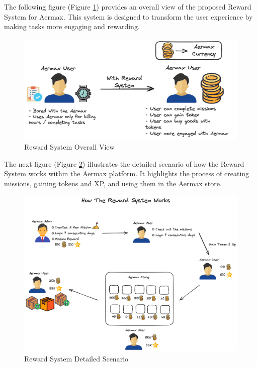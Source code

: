 The following figure (Figure \ref{fig:Reward_System_explain_image}) provides an overall view of the proposed Reward System for Aermax. This system is designed to transform the user experience by making tasks more engaging and rewarding.

\begin{figure}[H]
    \centering
    \includegraphics[width=1\textwidth]{src/assets/diagrams/rewardexplain.png}
    \caption{Reward System Overall View}
    \label{fig:Reward_System_explain_image}
\end{figure}

The next figure (Figure \ref{fig:Reward_System_detailed_explain_image}) illustrates the detailed scenario of how the Reward System works within the Aermax platform. It highlights the process of creating missions, gaining tokens and XP, and using them in the Aermax store.

\begin{figure}[H]
    \centering
    \includegraphics[width=1\textwidth]{src/assets/diagrams/rewardexplain2.png}
    \caption{Reward System Detailed Scenario}
    \label{fig:Reward_System_detailed_explain_image}
\end{figure}
   
